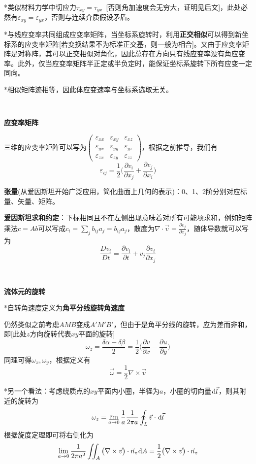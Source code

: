\documentclass[a4paper,UTF8,fontset=windows]{ctexart}
\newcommand*{\dr}{\hspace{0.07em}\mathrm{d}}
\begin{document}
\begin{enumerate}
    *类似材料力学中切应力$\tau_{xy}=\tau_{yx}$\ [否则角加速度会无穷大，证明见后文]，此处必然有$\varepsilon_{xy}=\varepsilon_{yx}$，否则与连续介质假设矛盾。

    *与线应变率共同组成应变率矩阵，当坐标系旋转时，利用\textbf{正交相似}可以得到新坐标系的应变率矩阵[若变换结果不为标准正交基，则一般为相合]。又由于应变率矩阵是对称阵，其可以正交相似对角化，因此总存在方向只有线应变率没有角应变率。此外，仅当应变率矩阵半正定或半负定时，能保证坐标系旋转下所有应变一定同向。

    *相似矩阵迹相等，因此体应变速率与坐标系选取无关。
\end{enumerate}

\

\textbf{应变率矩阵}

三维的应变率矩阵可以写为$\begin{pmatrix}\varepsilon_{xx}&\varepsilon_{xy}&\varepsilon_{xz}\\\varepsilon_{yx}&\varepsilon_{yy}&\varepsilon_{yz}\\\varepsilon_{zx}&\varepsilon_{zy}&\varepsilon_{zz}\end{pmatrix}$，根据之前推导，我们有
$$\varepsilon_{ij}=\frac{1}{2}\bigg(\frac{\partial v_i}{\partial x_j}+\frac{\partial v_j}{\partial x_i}\bigg)$$

\textbf{张量}(从爱因斯坦开始广泛应用，简化曲面上几何的表示)：0、1、2阶分别对应标量、矢量、矩阵。

\textbf{爱因斯坦求和约定}：下标相同且不在左侧出现意味着对所有可能项求和，例如矩阵乘法$c=Ab$可以写成$c_i=\sum_jb_{ij}a_j=b_{ij}a_j$，散度为$\nabla\cdot\vec{v}=\frac{\partial v_j}{\partial x_j}$，随体导数就可以写为
$$\frac{Dv_i}{Dt}=\frac{\partial v_i}{\partial t}+v_j\frac{\partial v_i}{\partial x_j}$$

\

\textbf{流体元的旋转}

*自转角速度定义为\textbf{角平分线旋转角速度}

仍然类似之前考虑$AMB$变成$A'M'B'$，但由于是角平分线的旋转，应为差而非和，即[此处$z$方向旋转代表$xy$平面的旋转]
$$\omega_z=\frac{\delta\alpha-\delta\beta}{2}=\frac{1}{2}\bigg(\frac{\partial v}{\partial x}-\frac{\partial u}{\partial y}\bigg)$$
同理可得$\omega_x,\omega_y$，根据定义有
$$\vec{\omega}=\frac{1}{2}\nabla\times\vec{v}$$

*另一个看法：考虑绕质点的$xy$平面内小圈，半径为$a$，小圈的切向量$\dr\vec{l}$，则其附近的旋转为
$$\omega_z=\lim_{a\to0}\frac{1}{a}\frac{1}{2\pi a}\oint_L\vec{v}\cdot\dr\vec{l}$$
根据旋度定理即可将右侧化为
$$\lim_{a\to0}\frac{1}{2\pi a^2}\iint_A\big(\nabla\times\vec{v}\big)\cdot\vec{n}_z\dr A=\frac{1}{2}\big(\nabla\times\vec{v}\big)\cdot\vec{n}_z$$
\end{document}

